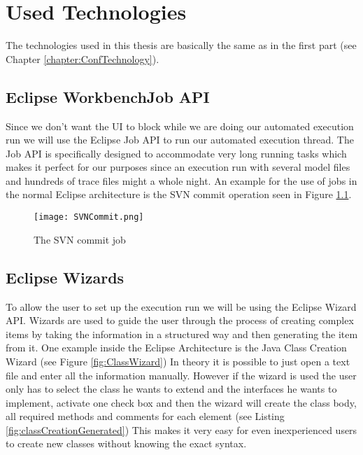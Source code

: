 \chapter{Used Technologies}
\label{chapter:AutoTechnologies}

The technologies used in this thesis are basically the same as in
the first part (see Chapter \ref{chapter:ConfTechnology}).

\section{Eclipse WorkbenchJob API}
\label{section:AutoTechJob}
Since we don't want the UI to block while we are doing our automated
execution run we will use the Eclipse Job API to run our
automated execution thread.
The Job API is specifically designed to accommodate very long running
tasks which makes it perfect for our purposes since an execution
run with several model files and hundreds of trace files might
a whole night.
An example for the use of jobs in the normal Eclipse architecture
is the SVN commit operation seen in Figure \ref{fig:SVNCommit}.

\begin{figure}[SVNCommit]
  \centering
  \texttt{[image: SVNCommit.png]}
  \caption[The SVN commit job]%
  {The SVN commit job\protect\footnotemark}
  \label{fig:SVNCommit}
\end{figure}



\section{Eclipse Wizards}
\label{section:AutoTechWizards}
To allow the user to set up the execution run we will be using the
Eclipse Wizard API.
Wizards are used to guide the user through the process of creating complex items by taking
the information in a structured way and then generating the item from it.
One example inside the Eclipse Architecture is the Java Class Creation Wizard (see Figure \ref{fig:ClassWizard})
In theory it is possible to just open a text file and enter all the information manually.
However if the wizard is used the user only has to select the class he wants to extend
and the interfaces he wants to implement, activate one check box and then the wizard will
create the class body, all required methods and comments for each element (see Listing \ref{fig:classCreationGenerated})
This makes it very easy for even inexperienced users to create new classes without knowing
the exact syntax.


